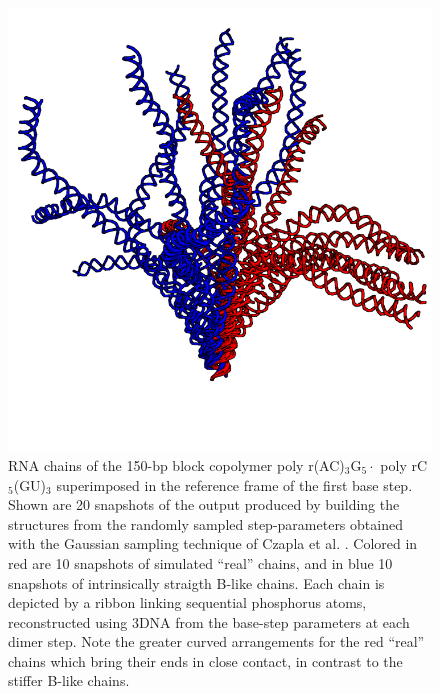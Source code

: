 \begin{figure}
\centering
\includegraphics[angle=0, scale=0.58]{Chapter4/states2.png}
\caption{RNA   chains    of   the   150-bp    block   copolymer   poly
  r(AC)$_{\text{3}}$G$_{\text{5}}\cdot$                            poly
  rC$_{\text{5}}$(GU)$_{\text{3}}$ superimposed in the reference frame
  of  the first  base  step.  Shown  are  20 snapshots  of the  output
  produced  by  building  the  structures from  the  randomly  sampled
  step-parameters  obtained with  the Gaussian  sampling  technique of
  Czapla et al. \cite{czapla2006}. Colored  in red are 10 snapshots of
  simulated ``real'' chains, and in blue 10 snapshots of intrinsically
  straigth B-like chains.  Each chain  is depicted by a ribbon linking
  sequential  phosphorus  atoms,  reconstructed  using 3DNA  from  the
  base-step  parameters at each  dimer step.  Note the  greater curved
  arrangements for the  red ``real'' chains which bring  their ends in
  close contact, in contrast to the stiffer B-like chains.}
\label{fig:rnatree}
\end{figure}  









